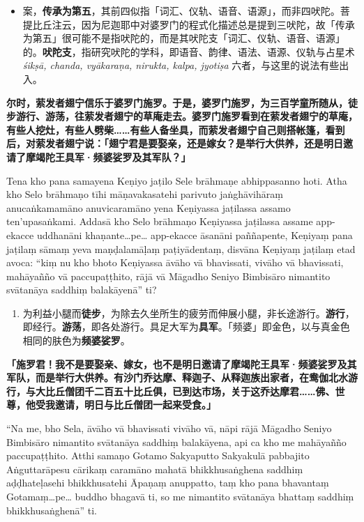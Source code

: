 \begin{itemize}\item 案，\textbf{传承为第五}，其前四似指「词汇、仪轨、语音、语源」，而非四吠陀。菩提比丘注云，因为尼迦耶中对婆罗门的程式化描述总是提到三吠陀，故「传承为第五」很可能不是指吠陀的，而是其吠陀支「词汇、仪轨、语音、语源」的。\textbf{吠陀支}，指研究吠陀的学科，即语音、韵律、语法、语源、仪轨与占星术 \textit{śikṣā, chanda, vyākaraṇa, nirukta, kalpa, jyotiṣa} 六者，与这里的说法有些出入。\end{itemize}

\textbf{尔时，萦发者翅宁信乐于婆罗门施罗。于是，婆罗门施罗，为三百学童所随从，徒步游行、游荡，往萦发者翅宁的草庵走去。婆罗门施罗看到在萦发者翅宁的草庵，有些人挖灶，有些人劈柴……有些人备坐具，而萦发者翅宁自己则搭帐篷，看到后，对萦发者翅宁说：「翅宁君是要娶亲，还是嫁女？是举行大供养，还是明日邀请了摩竭陀王具军·频婆娑罗及其军队？」}

Tena kho pana samayena Keṇiyo jaṭilo Sele brāhmaṇe abhippasanno hoti. Atha kho Selo brāhmaṇo tīhi māṇavakasatehi parivuto jaṅghāvihāraṃ anucaṅkamamāno anuvicaramāno yena Keṇiyassa jaṭilassa assamo ten’upasaṅkami. Addasā kho Selo brāhmaṇo Keṇiyassa jaṭilassa assame app-ekacce uddhanāni khaṇante…pe… app-ekacce āsanāni paññapente, Keṇiyaṃ pana jaṭilaṃ sāmaṃ yeva maṇḍalamāḷaṃ paṭiyādentaṃ, disvāna Keṇiyaṃ jaṭilaṃ etad avoca: “kiṃ nu kho bhoto Keṇiyassa āvāho vā bhavissati, vivāho vā bhavissati, mahāyañño vā paccupaṭṭhito, rājā vā Māgadho Seniyo Bimbisāro nimantito svātanāya saddhiṃ balakāyenā” ti?

\begin{enumerate}\item 为利益小腿而\textbf{徒步}，为除去久坐所生的疲劳而伸展小腿，非长途游行。\textbf{游行}，即经行。\textbf{游荡}，即各处游行。具足大军为\textbf{具军}。「频婆」即金色，以与真金色相同的肤色为\textbf{频婆娑罗}。\end{enumerate}

\textbf{「施罗君！我不是要娶亲、嫁女，也不是明日邀请了摩竭陀王具军·频婆娑罗及其军队，而是举行大供养。有沙门乔达摩、释迦子、从释迦族出家者，在鸯伽北水游行，与大比丘僧团千二百五十比丘俱，已到达市场，关于这乔达摩君……佛、世尊，他受我邀请，明日与比丘僧团一起来受食。」}

“Na me, bho Sela, āvāho vā bhavissati vivāho vā, nāpi rājā Māgadho Seniyo Bimbisāro nimantito svātanāya saddhiṃ balakāyena, api ca kho me mahāyañño paccupaṭṭhito. Atthi samaṇo Gotamo Sakyaputto Sakyakulā pabbajito Aṅguttarāpesu cārikaṃ caramāno mahatā bhikkhusaṅghena saddhiṃ aḍḍhateḷasehi bhikkhusatehi Āpaṇaṃ anuppatto, taṃ kho pana bhavantaṃ Gotamaṃ…pe… buddho bhagavā ti, so me nimantito svātanāya bhattaṃ saddhiṃ bhikkhusaṅghenā” ti.

